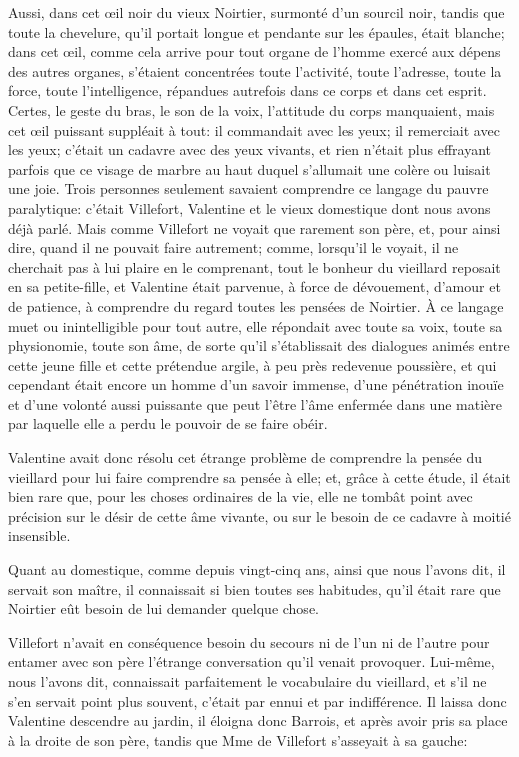 Aussi, dans cet œil noir du vieux Noirtier, surmonté d'un sourcil noir, tandis que toute la chevelure, qu'il portait longue et pendante sur les épaules, était blanche; dans cet œil, comme cela arrive pour tout organe de l'homme exercé aux dépens des autres organes, s'étaient concentrées toute l'activité, toute l'adresse, toute la force, toute l'intelligence, répandues autrefois dans ce corps et dans cet esprit. Certes, le geste du bras, le son de la voix, l'attitude du corps manquaient, mais cet œil puissant suppléait à tout: il commandait avec les yeux; il remerciait avec les yeux; c'était un cadavre avec des yeux vivants, et rien n'était plus effrayant parfois que ce visage de marbre au haut duquel s'allumait une colère ou luisait une joie. Trois personnes seulement savaient comprendre ce langage du pauvre paralytique: c'était Villefort, Valentine et le vieux domestique dont nous avons déjà parlé. Mais comme Villefort ne voyait que rarement son père, et, pour ainsi dire, quand il ne pouvait faire autrement; comme, lorsqu'il le voyait, il ne cherchait pas à lui plaire en le comprenant, tout le bonheur du vieillard reposait en sa petite-fille, et Valentine était parvenue, à force de dévouement, d'amour et de patience, à comprendre du regard toutes les pensées de Noirtier. À ce langage muet ou inintelligible pour tout autre, elle répondait avec toute sa voix, toute sa physionomie, toute son âme, de sorte qu'il s'établissait des dialogues animés entre cette jeune fille et cette prétendue argile, à peu près redevenue poussière, et qui cependant était encore un homme d'un savoir immense, d'une pénétration inouïe et d'une volonté aussi puissante que peut l'être l'âme enfermée dans une matière par laquelle elle a perdu le pouvoir de se faire obéir. 

Valentine avait donc résolu cet étrange problème de comprendre la pensée du vieillard pour lui faire comprendre sa pensée à elle; et, grâce à cette étude, il était bien rare que, pour les choses ordinaires de la vie, elle ne tombât point avec précision sur le désir de cette âme vivante, ou sur le besoin de ce cadavre à moitié insensible. 

Quant au domestique, comme depuis vingt-cinq ans, ainsi que nous l'avons dit, il servait son maître, il connaissait si bien toutes ses habitudes, qu'il était rare que Noirtier eût besoin de lui demander quelque chose. 

Villefort n'avait en conséquence besoin du secours ni de l'un ni de l'autre pour entamer avec son père l'étrange conversation qu'il venait provoquer. Lui-même, nous l'avons dit, connaissait parfaitement le vocabulaire du vieillard, et s'il ne s'en servait point plus souvent, c'était par ennui et par indifférence. Il laissa donc Valentine descendre au jardin, il éloigna donc Barrois, et après avoir pris sa place à la droite de son père, tandis que Mme de Villefort s'asseyait à sa gauche: 

